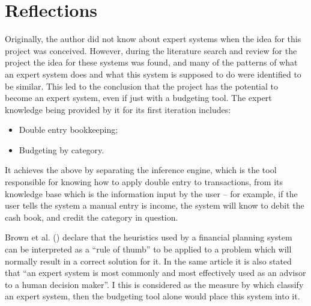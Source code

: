 \section{Reflections} \label{sec:Reflections}
Originally, the author did not know about expert systems when the idea for this
project was conceived. However, during the literature search and review for the
project the idea for these systems was found, and many of the patterns of what
an expert system does and what this system is supposed to do were identified to
be similar. This led to the conclusion that the project has the potential to
become an expert system, even if just with a budgeting tool. The expert
knowledge being provided by it for its first iteration includes:
\begin{itemize}
  \item
    Double entry bookkeeping;

  \item
    Budgeting by category.
\end{itemize}

It achieves the above by separating the inference engine, which is the tool
responsible for knowing how to apply double entry to transactions, from its
knowledge base which is the information input by the user -- for example, if
the user tells the system a manual entry is income, the system will know to
debit the cash book, and credit the category in question.

Brown et al. (\citeyear{brown1990expert}) declare that the heuristics used by a
financial planning system can be interpreted as a ``rule of thumb'' to be
applied to a problem which will normally result in a correct solution for it.
In the same article it is also stated that ``an expert system is most commonly
and most effectively used as an advisor to a human decision maker''. I this is
considered as the measure by which classify an expert system, then the
budgeting tool alone would place this system into it.
